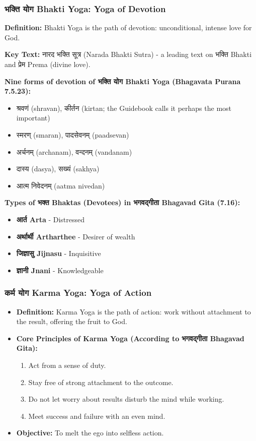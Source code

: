 \begin{frame}[fragile]\frametitle{भक्ति  योग Bhakti Yoga: Yoga of Devotion}
    \textbf{Definition:} Bhakti Yoga is the path of devotion: unconditional, intense love for God.


    \textbf{Key Text:} नारद भक्ति सूत्र (Narada Bhakti Sutra) - a leading text on भक्ति Bhakti and प्रेम Prema (divine love).

    
    \textbf{Nine forms of devotion of भक्ति  योग Bhakti Yoga (Bhagavata Purana 7.5.23):}
    \begin{itemize}
        \item श्रवणं (shravan), कीर्तन (kirtan; the Guidebook calls it perhaps the most important)
        \item स्मरण् (smaran), पादसेवनम् (paadsevan)
        \item अर्चनम् (archanam), वन्दनम् (vandanam)
        \item दास्य (dasya), सख्यं (sakhya)
        \item आत्म निवेदनम् (aatma nivedan)
    \end{itemize}

    
    \textbf{Types of भक्त  Bhaktas (Devotees) in भगवद्गीता  Bhagavad Gita (7.16):}
    \begin{itemize}
        \item \textbf{आर्त  Arta} - Distressed
        \item \textbf{अर्थार्थी Artharthee} - Desirer of wealth
        \item \textbf{जिज्ञासु Jijnasu} - Inquisitive
        \item \textbf{ज्ञानी Jnani} - Knowledgeable
		
    \end{itemize}
\end{frame}

\begin{frame}[fragile]\frametitle{कर्म योग  Karma Yoga: Yoga of Action}
          \begin{itemize}
	  \item \textbf{Definition:} Karma Yoga is the path of action: work without attachment to the result, offering the fruit to God.


	  \item \textbf{Core Principles of Karma Yoga (According to भगवद्गीता Bhagavad Gita):}
    \begin{enumerate}
        \item Act from a sense of duty.
        \item Stay free of strong attachment to the outcome.
        \item Do not let worry about results disturb the mind while working.
        \item Meet success and failure with an even mind.
    \end{enumerate}

	  \item  \textbf{Objective:} To melt the ego into selfless action.
	      \end{itemize}

\end{frame}

